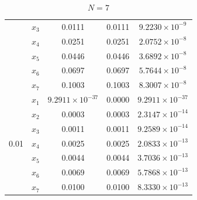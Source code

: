 \begin{solution}
\begin{english}
\begin{table}[ht]
\begin{tabular}{|c|c|c|c|c|}
			& $x_3$ & 0.0111 & 0.0111 & $9.2230 \times 10^{-9}$ \\
			& $x_4$ & 0.0251 & 0.0251 & $2.0752 \times 10^{-8}$ \\
			& $x_5$ & 0.0446 & 0.0446 & $3.6892 \times 10^{-8}$ \\
			& $x_6$ & 0.0697 & 0.0697 & $5.7644 \times 10^{-8}$ \\
			& $x_7$ & 0.1003 & 0.1003 & $8.3007 \times 10^{-8}$ \\
			\hline
			\multirow{7}{*}{0.01} & $x_1$ & $9.2911 \times 10^{-37}$ & 0.0000 & $9.2911 \times 10^{-37}$ \\
			& $x_2$ & 0.0003 & 0.0003 & $2.3147 \times 10^{-14}$ \\
			& $x_3$ & 0.0011 & 0.0011 & $9.2589 \times 10^{-14}$ \\
			& $x_4$ & 0.0025 & 0.0025 & $2.0833 \times 10^{-13}$ \\
			& $x_5$ & 0.0044 & 0.0044 & $3.7036 \times 10^{-13}$ \\
			& $x_6$ & 0.0069 & 0.0069 & $5.7868 \times 10^{-13}$ \\
			& $x_7$ & 0.0100 & 0.0100 & $8.3330 \times 10^{-13}$ \\
			\hline
		\end{tabular}
		\caption{$N=7$}
		\label{tab:firstexN7}
	\end{table}
\end{english}


\end{solution}
